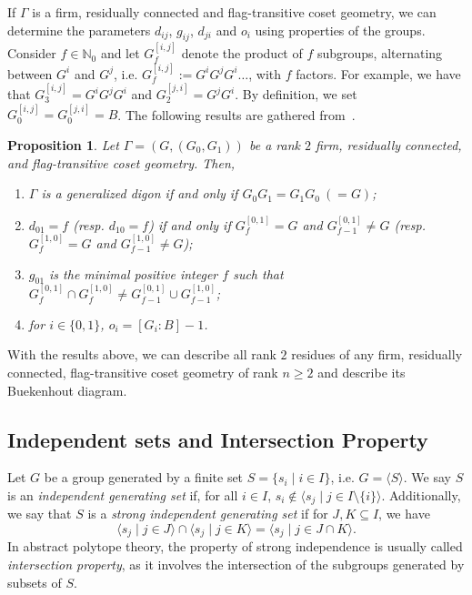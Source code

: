 \documentclass[11pt,letterpaper]{amsart}
\newtheorem{proposition}[theorem]{Proposition}
\begin{document}
If $\Gamma$ is a firm, residually connected and flag-transitive coset geometry, we can determine the parameters $d_{ij}$, $g_{ij}$, $d_{ji}$ and $o_i$ using properties of the groups.
Consider $f\in \mathbb{N}_0$ and let $G^{[i,j]}_f$ denote the product of $f$ subgroups, alternating between $G^i$ and $G^j$, i.e. $G^{[i,j]}_f := G^iG^jG^i\ldots$, with $f$ factors. For example, we have that $G^{[i,j]}_3 = G^iG^jG^i$ and $G^{[j,i]}_2=G^jG^i$. By definition, we set $G^{[i,j]}_0=G^{[j,i]}_0=B$.
The following results are gathered from~\cite{Pasini1994}.
\begin{proposition}\cite[pp. 307]{Pasini1994}\label{prop:rank2_passini}
    Let $\Gamma=(G,(G_0,G_1))$ be a rank $2$ firm, residually connected, and flag-transitive coset geometry.
    Then,
    \begin{enumerate}
        \item $\Gamma$ is a generalized digon if and only if $G_0G_1=G_1G_0\ (=G)$;
        \item $d_{01}=f$ (resp. $d_{10}=f$) if and only if $G^{[0,1]}_f=G$ and $G^{[0,1]}_{f-1}\neq G$ (resp. $G^{[1,0]}_f=G$ and $G^{[1,0]}_{f-1}\neq G$);
        \item $g_{01}$ is the minimal positive integer $f$ such that $G^{[0,1]}_f\cap G^{[1,0]}_f \neq G^{[0,1]}_{f-1}\cup G^{[1,0]}_{f-1}$;
        \item for $i\in \{0,1\}$, $o_i=[G_i:B]-1$.
    \end{enumerate}
\end{proposition}
With the results above, we can describe all rank $2$ residues of any firm, residually connected, flag-transitive coset geometry of rank $n\geq 2$ and describe its Buekenhout diagram. 


\subsection{Independent sets and Intersection Property}\label{sec:back:IP}

Let $G$ be a group generated by a finite set $S=\{s_i\mid i\in I\}$, i.e. $G = \langle S\rangle$. We say $S$ is an \emph{independent generating set} if, for all $i\in I$, $s_i\notin\langle s_j\mid j\in I\setminus\{i\}  \rangle$.
Additionally, we say that $S$ is a \emph{strong independent generating set} if for $J,K\subseteq I$, we have $$\langle s_j\mid j\in J\rangle\cap \langle s_j\mid j\in K\rangle = \langle s_j\mid j\in J\cap K\rangle.$$
In abstract polytope theory, the property of strong independence is usually called \emph{intersection property}, as it involves the intersection of the subgroups generated by subsets of $S$.
\end{document}
